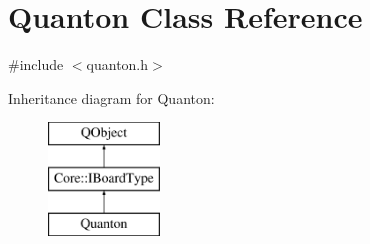 \hypertarget{class_quanton}{\section{Quanton Class Reference}
\label{class_quanton}
}


{\ttfamily \#include $<$quanton.\-h$>$}

Inheritance diagram for Quanton\-:\begin{figure}[H]
\begin{center}
\leavevmode
\includegraphics[height=3.000000cm]{class_quanton}
\end{center}
\end{figure}
